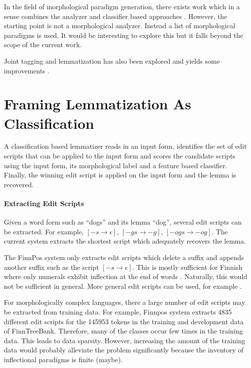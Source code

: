 In the field of morphological paradigm generation, there exists work
which in a sense combines the analyzer and classifier based approaches
\cite{Hulden2014}. However, the starting point is not a morphological
analyzer. Instead a list of morphological paradigms is used. It would
be interesting to explore this but it falls beyond the scope of the
current work.

Joint tagging and lemmatization has also been explored and yields some
improvements \cite{Muller2015}.


\section{Framing Lemmatization As Classification}

A classification based lemmatizer reads in an input form, identifies
the set of edit scripts that can be applied to the input form and
scores the candidate scripts using the input form, its morphological
label and a feature based classifier. Finally, the winning edit script
is applied on the input form and the lemma is recovered.

\paragraph{Extracting Edit Scripts} Given a word form such as ``dogs''
and its lemma ``dog'', several edit scripts can be extracted. For
example, $[-s \rightarrow \epsilon]$, $[-gs \rightarrow -g]$, $[-ogs
\rightarrow -og]$. The current system extracts the shortest script
which adequately recovers the lemma. 

The FinnPos system only extracts edit scripts which delete a suffix
and appends another suffix such as the script $[-s \rightarrow
\epsilon]$. This is mostly sufficient for Finnish where only numerals
exhibit inflection at the end of words \cite{}. Naturally, this would
not be sufficient in general. More general edit scripts can be used,
for example \cite{Chrupala2008}.

For morphologically complex languages, there a large number of edit
scripts may be extracted from training data. For example, Finnpos
system extracts 4835 different edit scripts for the 145953 tokens in
the training and development data of FinnTreeBank. Therefore, many of
the classes occur few times in the training data. This leads to
data sparsity. However, increasing the amount of the training data
would probably alleviate the problem significantly because the
inventory of inflectional paradigms is finite (maybe).

